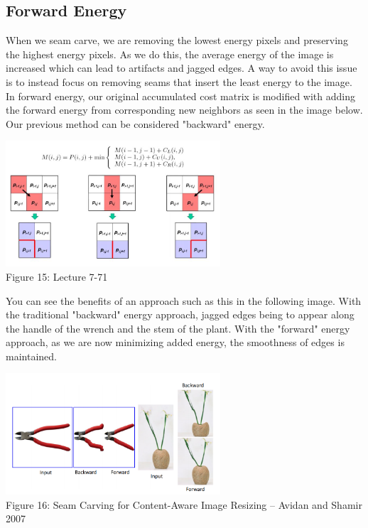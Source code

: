 \documentclass{article}
\begin{document}
\subsection{Forward Energy}
When we seam carve, we are removing the lowest energy pixels and preserving the highest energy pixels. As we do this, the average energy of the image is increased which can lead to artifacts and jagged edges. A way to avoid this issue is to instead focus on removing seams that insert the least energy to the image. In forward energy, our original accumulated cost matrix is modified with adding the forward energy from corresponding new neighbors as seen in the image below. Our previous method can be considered "backward" energy. 

\begin{center}
\includegraphics[width=8cm]{forward_energy_calculation.JPG} \\
Figure 15: Lecture 7-71
\end{center}

You can see the benefits of an approach such as this in the following image. With the traditional "backward" energy approach, jagged edges being to appear along the handle of the wrench and the stem of the plant. With the "forward" energy approach, as we are now minimizing added energy, the smoothness of edges is maintained. 

\begin{center}
\includegraphics[width=8cm]{forward_energy.PNG} \\
Figure 16: Seam	Carving	for	Content-Aware	Image	Resizing	– Avidan and	Shamir	2007
\end{center}
\end{document}
